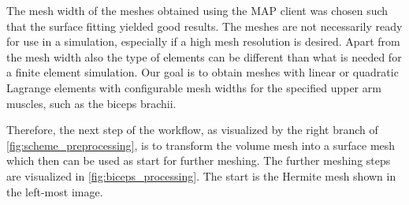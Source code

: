The mesh width of the meshes obtained using the MAP client was chosen such that the surface fitting yielded good results. The meshes are not necessarily ready for use in a simulation, especially if a  high mesh resolution is desired. 
Apart from the mesh width also the type of elements can be different than what is needed for a finite element simulation. Our goal is to obtain meshes with linear or quadratic Lagrange elements with configurable mesh widths for the specified upper arm muscles, such as the biceps brachii.

Therefore, the next step of the workflow, as visualized by the right branch of \cref{fig:scheme_preprocessing}, is to transform the volume mesh into a surface mesh which then can be used as start for further meshing. The further meshing steps are visualized in \cref{fig:biceps_processing}. The start is the Hermite mesh shown in the left-most image.

